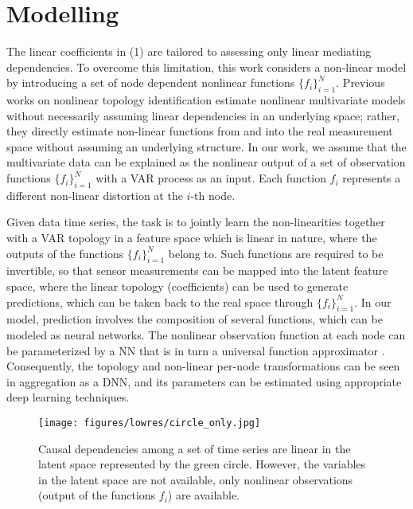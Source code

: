 \section{Modelling}
\label{sec:modelling}

The linear coefficients in (1) are tailored to assessing only linear mediating dependencies. To overcome this
limitation, this work considers a non-linear model by introducing a set of node dependent nonlinear functions $\{f_i\}_{i=1}^{N}$. 
Previous works on nonlinear topology identification \cite{shen2019nonlinear,tank2017interpretable,money2021online} estimate nonlinear multivariate models without necessarily assuming linear dependencies in an underlying space; rather, they directly estimate non-linear functions from and into the real measurement space without assuming an underlying structure. In our work, we assume that the multivariate data can be explained as the nonlinear output of a set of observation functions $\{f_i\}_{i=1}^{N}$ with a VAR process as an input. Each function $f_i$ represents a different non-linear distortion at the $i$-th node.

Given data time series, the task is to jointly learn the non-linearities together with a VAR topology in a feature space which is linear in nature, where the outputs of the functions $\{f_i\}_{i=1}^{N}$ belong to. Such functions are required to be invertible, so that sensor measurements can be mapped into the latent feature space, where the linear topology (coefficients) can be used to generate predictions, which can be taken back to the real space through $\{f_i\}_{i=1}^{N}$. In our model, prediction involves the composition of several functions, which can be modeled as neural networks. The nonlinear observation function at each node can be parameterized by a NN that is in turn a universal function approximator \cite{cybenko1989approximation}. 
Consequently, the topology and non-linear per-node transformations can be seen in aggregation as a DNN, and its parameters can be estimated using appropriate deep learning techniques.

\begin{figure}[h]
\vspace{-0.6cm}
\centering
\texttt{[image: figures/lowres/circle\_only.jpg]}
\vspace{-0.5cm}
\caption{{Causal dependencies among a set of time series are linear in the latent space represented by the green circle. However, the variables in the latent space are not available, only nonlinear observations (output of the functions $f_i$) are available.}\vspace{-0.3cm}} 
\label{fig:swn3}
\end{figure}


